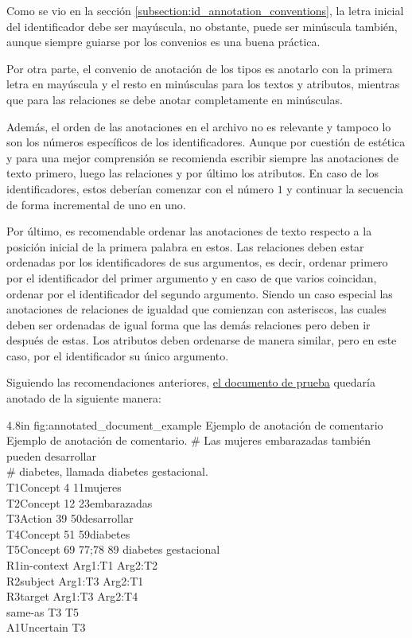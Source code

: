 Como se vio en la sección \ref{subsection:id_annotation_conventions}, la letra inicial del identificador debe ser mayúscula, no obstante, puede ser minúscula también, aunque siempre guiarse por los convenios es una buena práctica.

Por otra parte, el convenio de anotación de los tipos es anotarlo con la primera letra en mayúscula y el resto en minúsculas para los textos y atributos, mientras que para las relaciones se debe anotar completamente en minúsculas.

Además, el orden de las anotaciones en el archivo no es relevante y tampoco lo son los números específicos de los identificadores. Aunque por cuestión de estética y para una mejor comprensión se recomienda escribir siempre las anotaciones de texto primero, luego las relaciones y por último los atributos. En caso de los identificadores, estos deberían comenzar con el número $1$ y continuar la secuencia de forma incremental de uno en uno.

Por último, es recomendable ordenar las anotaciones de texto respecto a la posición inicial de la primera palabra en estos. Las relaciones deben estar ordenadas por los identificadores de sus argumentos, es decir, ordenar primero por el identificador del primer argumento y en caso de que varios coincidan, ordenar por el identificador del segundo argumento. Siendo un caso especial las anotaciones de relaciones de igualdad que comienzan con asteriscos, las cuales deben ser ordenadas de igual forma que las demás relaciones pero deben ir después de estas. Los atributos deben ordenarse de manera similar, pero en este caso, por el identificador su único argumento.

Siguiendo las recomendaciones anteriores, \hyperref[sentence:annotation_example]{el documento de prueba} quedaría anotado de la siguiente manera:

\begin{annexample}
	[backgroundcolor=cyan!13]
	{4.8in}
	{fig:annotated_document_example}
	{Ejemplo de anotación de comentario}
	{Ejemplo de anotación de comentario.}
	\# Las mujeres embarazadas también pueden desarrollar\\
	\# diabetes, llamada diabetes gestacional.\\
	T1\space\space Concept 4 11\space\space\space\space mujeres\\
	T2\space\space Concept 12 23\space\space\space embarazadas\\
	T3\space\space Action 39 50\space\space\space\space desarrollar\\
	T4\space\space Concept 51 59\space\space\space diabetes\\
	T5\space\space Concept 69 77;78 89 diabetes gestacional\\
	R1\space\space in-context Arg1:T1 Arg2:T2\\
	R2\space\space subject Arg1:T3 Arg2:T1\\
	R3\space\space target Arg1:T3 Arg2:T4\\
	\textasteriskcentered\space\space\space same-as T3 T5\\
	A1\space\space Uncertain T3
\end{annexample}


